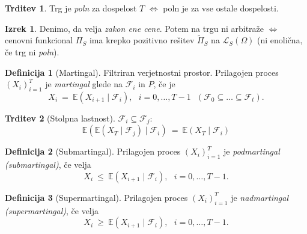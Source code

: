 \documentclass[11pt]{article}
\newcommand{\E}{\mathbb{E}}
\newcommand{\F}{\mathcal{F}}
\theoremstyle{definition}
\newtheorem{definicija}{Definicija}[section]
\theoremstyle{definition}
\newtheorem{trditev}{Trditev}[section]
\newtheorem{izrek}{Izrek}[section]
\begin{document}
\begin{trditev}

Trg je \textit{poln} za dospelost $T$ $\iff$ poln je za vse ostale dospelosti.

\end{trditev}
\vspace{0.5cm}

\begin{izrek}

Denimo, da velja \textit{zakon ene cene}. Potem na trgu ni arbitraže $\iff$ cenovni funkcional $\Pi_S$ ima krepko pozitivno rešitev $\tilde{\Pi}_S$ na $\mathcal{L}_S(\Omega)$ (ni enolična, če trg ni \textit{poln}).

\end{izrek}
\vspace{0.5cm}

\begin{definicija}[Martingal]

Filtriran verjetnostni prostor. Prilagojen proces $(X_i)_{i=1}^T$ je \textit{martingal} glede na $\F_i$ in $P$, če je 
$$X_i ~=~ \E(X_{i+1} \mid \F_i), ~~~i = 0, \ldots, T-1 ~~~(\F_0 \subseteq \ldots \subseteq \F_t).$$ 

\end{definicija}
\vspace{0.5cm}

\begin{trditev}[Stolpna lastnost]

$\F_i \subseteq \F_j$:
$$\E(\E(X_T \mid \F_j) \mid \F_i) ~=~ \E(X_T \mid \F_i)$$

\end{trditev}
\vspace{0.5cm}

\begin{definicija}[Submartingal]

Prilagojen proces $(X_i)_{i=1}^T$ je \textit{podmartingal (submartingal)}, če velja
$$X_i ~\leq~ \E(X_{i+1} \mid \F_i), ~~~i=0, \ldots, T-1.$$

\end{definicija}
\vspace{0.5cm}

\begin{definicija}[Supermartingal]

Prilagojen proces $(X_i)_{i=1}^T$ je \textit{nadmartingal (supermartingal)}, če velja
$$X_i ~\geq~ \E(X_{i+1} \mid \F_i), ~~~i=0, \ldots, T-1.$$

\end{definicija}
\vspace{0.5cm}
\end{document}
